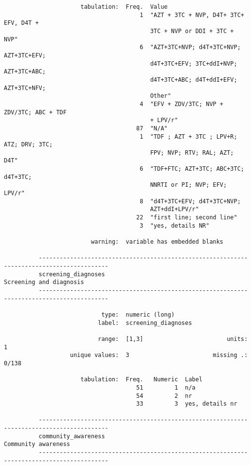 \documentclass{article}
\begin{document}
\begin{verbatim}
                      tabulation:  Freq.  Value
                                       1  "AZT + 3TC + NVP, D4T+ 3TC+ EFV, D4T +
                                          3TC + NVP or DDI + 3TC + NVP"
                                       6  "AZT+3TC+NVP; d4T+3TC+NVP; AZT+3TC+EFV;
                                          d4T+3TC+EFV; 3TC+ddI+NVP; AZT+3TC+ABC;
                                          d4T+3TC+ABC; d4T+ddI+EFV; AZT+3TC+NFV;
                                          Other"
                                       4  "EFV + ZDV/3TC; NVP + ZDV/3TC; ABC + TDF
                                          + LPV/r"
                                      87  "N/A"
                                       1  "TDF ; AZT + 3TC ; LPV+R; ATZ; DRV; 3TC;
                                          FPV; NVP; RTV; RAL; AZT; D4T"
                                       6  "TDF+FTC; AZT+3TC; ABC+3TC; d4T+3TC;
                                          NNRTI or PI; NVP; EFV; LPV/r"
                                       8  "d4T+3TC+EFV; d4T+3TC+NVP;
                                          AZT+ddI+LPV/r"
                                      22  "first line; second line"
                                       3  "yes, details NR"
          
                         warning:  variable has embedded blanks
          
          ------------------------------------------------------------------------------------------
          screening_diagnoses                                                Screening and diagnosis
          ------------------------------------------------------------------------------------------
          
                            type:  numeric (long)
                           label:  screening_diagnoses
          
                           range:  [1,3]                        units:  1
                   unique values:  3                        missing .:  0/138
          
                      tabulation:  Freq.   Numeric  Label
                                      51         1  n/a
                                      54         2  nr
                                      33         3  yes, details nr
          
          ------------------------------------------------------------------------------------------
          community_awareness                                                    Community awareness
          ------------------------------------------------------------------------------------------
          

\end{verbatim}
\end{document}

